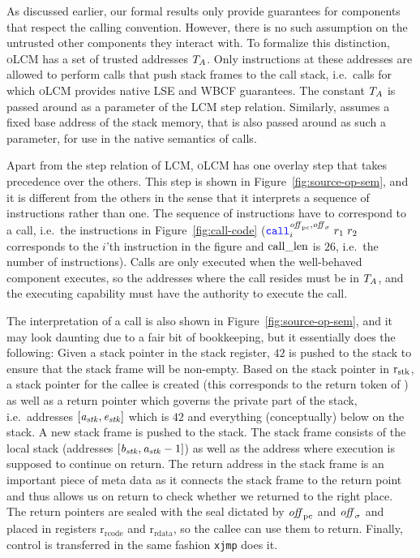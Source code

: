 \documentclass[acmsmall,review,anonymous]{acmart}\settopmatter{printfolios=true,printccs=false,printacmref=false}
\renewcommand{\rretc}{\mathrm{r}_{\mathrm{rcode}}}
\renewcommand{\rretd}{\mathrm{r}_{\mathrm{rdata}}}
\newcommand{\trgcm}{\textsc{LCM}}
\newcommand{\srccm}{\textsc{oLCM}}
\begin{document}
As discussed earlier, our formal results only provide guarantees for components that respect the calling convention.
However, there is no such assumption on the untrusted other components they interact with.
To formalize this distinction, \srccm{} has a set of trusted addresses $T_{A}$.
Only instructions at these addresses are allowed to perform calls that push stack frames to the call stack, i.e.\ calls for which \srccm{} provides native LSE and WBCF guarantees.
The constant $T_{A}$ is passed around as a parameter of the \trgcm{} step relation.
Similarly, \stktokens{} assumes a fixed base address of the stack memory, that is also passed around as such a parameter, for use in the native semantics of calls.

Apart from the step relation of \trgcm{}, \srccm{} has one overlay step that takes precedence over the others.
This step is shown in Figure~\ref{fig:source-op-sem}, and it is different from the others in the sense that it interprets a sequence of instructions rather than one.
The sequence of instructions have to correspond to a call, i.e.\ the instructions in Figure~\ref{fig:call-code} ({\footnotesize $\scall[i]{\offpc,\offsigma}{r_1}{r_2}$} corresponds to the $i$'th instruction in the figure and $\mathrm{call\_len}$ is $26$, i.e.\ the number of instructions).
Calls are only executed when the well-behaved component executes, so the addresses where the call resides must be in $T_{A}$, and the executing capability must have the authority to execute the call.

The interpretation of a call is also shown in Figure~\ref{fig:source-op-sem}, and it may look daunting due to a fair bit of bookkeeping, but it essentially does the following: Given a stack pointer in the stack register, $42$ is pushed to the stack to ensure that the stack frame will be non-empty.
Based on the stack pointer in $\mathrm{r}_\mathrm{stk}$, a stack pointer for the callee is created (this corresponds to the return token of \stktokens{}) as well as a return pointer which governs the private part of the stack, i.e.\ addresses $[\mathit{a}_{\mathit{stk}},\mathit{e}_{\mathit{stk}}]$ which is $42$ and everything (conceptually) below on the stack.
A new stack frame is pushed to the stack.
The stack frame consists of the local stack (addresses $[\mathit{b}_{\mathit{stk}},\mathit{a}_{\mathit{stk}}-1]$) as well as the address where execution is supposed to continue on return.
The return address in the stack frame is an important piece of meta data as it connects the stack frame to the return point and thus allows us on return to check whether we returned to the right place.
The return pointers are sealed with the seal dictated by $\mathit{off}_{\mathrm{pc}}$ and $\mathit{off}_\sigma$ and placed in registers $\rretc$ and $\rretd$, so the callee can use them to return.
Finally, control is transferred in the same fashion \texttt{xjmp} does it.
\end{document}
